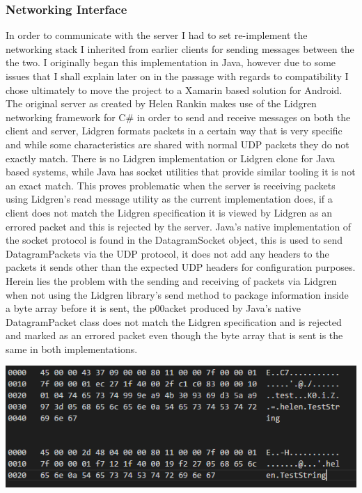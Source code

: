 \documentclass{article}
\begin{document}
\subsubsection{Networking Interface}
In order to communicate with the server I had to set re-implement the networking stack I inherited from earlier clients for sending messages between the the two. I originally began this implementation in Java, however due to some issues that I shall explain later on in the passage with regards to compatibility I chose ultimately to move the project to a Xamarin based solution for Android. The original server as created by Helen Rankin makes use of the Lidgren networking framework for C\# in order to send and receive messages on both the client and server, Lidgren formats packets in a certain way that is very specific and while some characteristics are shared with normal UDP packets they do not exactly match. There is no Lidgren implementation or Lidgren clone for Java based systems, while Java has socket utilities that provide similar tooling it is not an exact match. This proves problematic when the server is receiving packets using Lidgren’s read message utility as the current implementation does, if a client does not match the Lidgren specification it is viewed by Lidgren as an errored packet and this is rejected by the server. Java’s native implementation of the socket protocol is found in the DatagramSocket object, this is used to send DatagramPackets via the UDP protocol, it does not add any headers to the packets it sends other than the expected UDP headers for configuration purposes. Herein lies the problem with the sending and receiving of packets via Lidgren when not using the Lidgren library’s send method to package information inside a byte array before it is sent, the p00acket produced by Java’s native DatagramPacket class does not match the Lidgren specification and is rejected and marked as an errored packet even though the byte array that is sent is the same in both implementations. \\
\begin{center}
\includegraphics{packetdiff.png}
\end{center}
\end{document}
